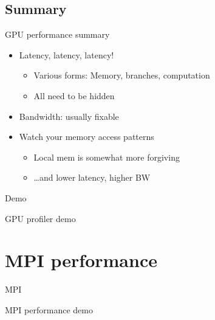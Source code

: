 \documentclass[english,compress]{beamer}
\begin{document}
\subsection{Summary}
\begin{frame}{GPU performance summary}
  \begin{itemize}
    \item Latency, latency, latency!
      \begin{itemize}
        \item Various forms: Memory, branches, computation
        \item All need to be hidden
      \end{itemize}
    \item Bandwidth: usually fixable
    \item Watch your memory access patterns
      \begin{itemize}
        \item Local mem is somewhat more forgiving
        \item \dots and lower latency, higher BW
      \end{itemize}
  \end{itemize}
\end{frame}
\begin{frame}{Demo}
  \begin{center}
  \Huge GPU profiler demo
  \end{center}
\end{frame}

\section{MPI performance}
\begin{frame}{MPI}
  \begin{center}
  \Huge MPI performance demo
  \end{center}
\end{frame}
\long{}
\end{document}
